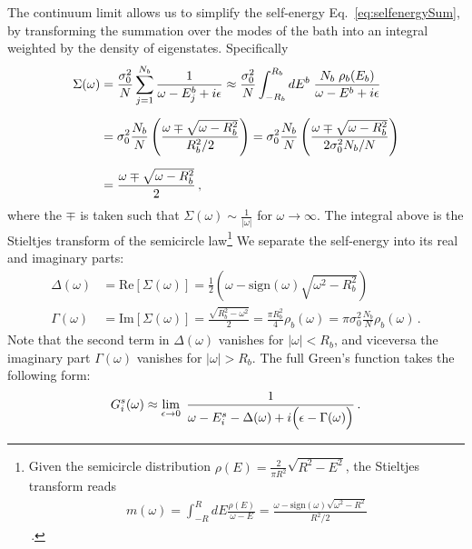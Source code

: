 The continuum limit allows us to simplify the self-energy Eq.~\ref{eq:selfenergySum}, by transforming the summation over the modes of the bath into an integral weighted by the density of eigenstates. Specifically
\begin{align}
    \Sigma(\omega) & = \frac{\sigma_0^2}{N} \sum_{j=1}^{N_b} \frac{1}{\omega-E^b_j+i\epsilon}
    \approx
    \frac{\sigma_0^2}{N}
    \int_{-R_b}^{R_b} dE^b \hspace{0.1cm} \frac{ N_b \hspace{0.1cm}\rho_b(E_b)}{\omega-E^b+i\epsilon}
    \\[0.2cm]
    & =
    \sigma_0^2 \frac{N_b}{N}\left(\frac{ \omega \mp \sqrt{\omega-R_b^2} }{R_b^2/2} \right) =
    \sigma_0^2 \frac{N_b}{N}\left(\frac{ \omega \mp \sqrt{\omega-R_b^2} }{2 \sigma_0^2 N_b/N } \right)
    \\[0.2cm]
    & = \frac{ \omega \mp \sqrt{\omega-R_b^2} }{2} \,,
\end{align}
where the $\mp$ is taken such that $\Sigma(\omega) \sim \frac{1}{\left|\omega\right|}$ for $\omega\to\infty$.
The integral above is the Stieltjes transform of the semicircle law\footnote{Given the semicircle distribution $\rho(E) = \frac{2}{\pi R^2} \sqrt{R^2 - E^2}$, the Stieltjes transform reads
\begin{align}
    m(\omega) = \int_{-R}^R dE \frac{\rho(E)}{\omega-E} = \frac{\omega - \text{sign}(\omega) \sqrt{\omega^2 - R^2}}{R^2/2} 
\end{align}\,.
}
We separate the self-energy into its real and imaginary parts:
\begin{align}
    \Delta(\omega) &= \text{Re}\left[ \Sigma(\omega)\right] =
    \frac{1}{2} \left(\omega - \text{sign}(\omega)\sqrt{\omega^2-R_b^2}   \right)
    \label{eq:selfenergy_real}
    \\[0.2cm]
    \Gamma(\omega) &= \text{Im}\left[ \Sigma(\omega)\right] =
    \frac{\sqrt{R_b^2-\omega^2}}{2}
    = \frac{\pi R_b^2}{4} \rho_b(\omega) = \pi \sigma_0^2 \frac{N_b}{N} \rho_b(\omega)
    \label{eq:selfenergy_imag} \,.
\end{align}
Note that the second term in $\Delta(\omega)$ vanishes for $\left|\omega\right|<R_b$, and viceversa the imaginary part $\Gamma(\omega)$ vanishes for $\left|\omega\right|>R_b$.
The full Green's function takes the following form:
\begin{equation}
    G^s_i(\omega) \approx
    \lim_{\epsilon\to0}
    \hspace{0.1cm}
    \frac{1}{\omega - E^s_i -\Delta(\omega) + i\Big(\epsilon - \Gamma(\omega)\Big)} \,.
    \label{eq:FullGreenFunctionIntegral}
\end{equation}
